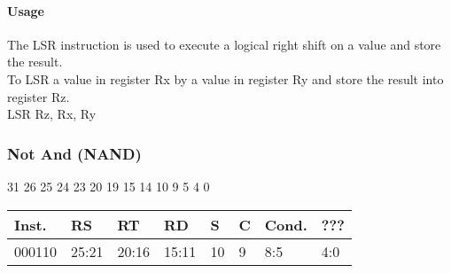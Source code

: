 \documentclass[12pt]{article}
\begin{document}
    \paragraph{Usage}
    \begin{flushleft}
    The LSR instruction is used to execute a logical right shift on a value and store the result.\\
    \vspace{1em}
    To LSR a value in register Rx by a value in register Ry and store the result into register Rz.\\
    \vspace{1em}
    LSR Rz, Rx, Ry
    \end{flushleft}
   
   




    \newpage
    \subsubsection{Not And (NAND)}
    
    \hspace{1.6cm}31 \hspace{1.2cm}26 \hspace{.075cm}25 \hspace{.15cm}24 \hspace{.075cm}23 \hspace{.875cm}20 \hspace{.04cm}19 \hspace{.8cm}15 \hspace{.04cm}14 \hspace{.8cm}10 \hspace{.04cm}9 \hspace{1.15cm}5 \hspace{.04cm}4 \hspace{1.25cm}0
    \vspace{-.25cm}
    \begin{center}
        \begin{tabular}{ |p{1.8cm}|p{1.5cm}|p{1.5cm}|p{1.5cm}|p{0.3cm}|p{0.3cm}|p{1.5cm}|p{1.5cm}| }
            \hline
            \textbf{Inst.} & \textbf{RS}& \textbf{RT} & \textbf{RD} & \textbf{S} & \textbf{C} & \textbf{Cond.} & ???\\
            \hline
            000110& 25:21 & 20:16 & 15:11 & 10 & 9 & 8:5 &4:0\\
            \hline
        \end{tabular}
    \end{center}
    
\end{document}
